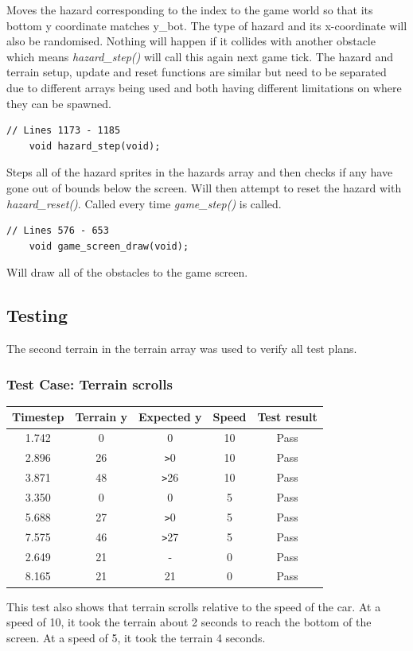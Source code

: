 \documentclass{article}
\begin{document}
Moves the hazard corresponding to the index to the game world so that its bottom y coordinate matches y\_bot. The type of hazard and its x-coordinate will also be randomised. Nothing will happen if it collides with another obstacle which means \emph{hazard\_step()} will call this again next game tick. The hazard and terrain setup, update and reset functions are similar but need to be separated due to different arrays being used and both having different limitations on where they can be spawned.
\begin{lstlisting}[style=CStyle]
	// Lines 1173 - 1185
	void hazard_step(void);
\end{lstlisting}
Steps all of the hazard sprites in the hazards array and then checks if any have gone out of bounds below the screen. Will then attempt to reset the hazard with \emph{hazard\_reset()}. Called every time \emph{game\_step()} is called.
\begin{lstlisting}[style=CStyle]
	// Lines 576 - 653
	void game_screen_draw(void);
\end{lstlisting}
Will draw all of the obstacles to the game screen.
\newpage

\subsection*{Testing}
The second terrain in the terrain array was used to verify all test plans.

\subsubsection*{Test Case: Terrain scrolls}
\begin{center}
\begin{tabular}{ c c c c c }
Timestep	& Terrain y	& Expected y 	& Speed	& Test result		\\ \hline
1.742		& 0		& 0 			& 10		& Pass		\\
2.896		& 26		& \verb|>|0		& 10		& Pass		\\
3.871		& 48		& \verb|>|26	& 10		& Pass		\\
3.350		& 0		& 0			& 5		& Pass		\\
5.688		& 27		& \verb|>|0		& 5		& Pass		\\
7.575		& 46		& \verb|>|27	& 5		& Pass		\\
2.649		& 21		& - 			& 0		& Pass		\\
8.165		& 21		& 21			& 0		& Pass		\\ \hline
\end{tabular}
\end{center}
This test also shows that terrain scrolls relative to the speed of the car. At a speed of 10, it took the terrain about 2 seconds to reach the bottom of the screen. At a speed of 5, it took the terrain 4 seconds.
\clearpage
\end{document}
